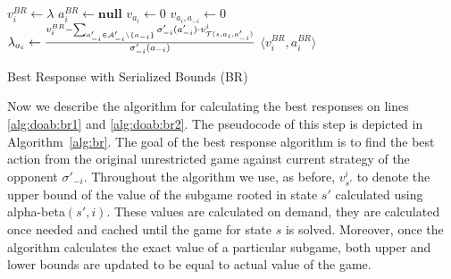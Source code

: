 \begin{algorithm2e}[t]
\small
{}
$v^{BR}_i \leftarrow \lambda$ \;
$a_i^{BR} \leftarrow \textbf{null}$ \;
 {%
	$v_{a_i} \leftarrow 0$\;
	 {\label{alg:br:opp}
    $v_{a_i,a_{-i}} \leftarrow 0$\;
		$\lambda_{a_i} \leftarrow \frac{v_i^{BR} - \sum_{a'_{-i} \in \mathcal{A}'_{-i} \setminus \lbrace a_{-i} \rbrace} \sigma'_{-i}(a'_{-i}) \cdot v^i_{\mathcal{T}(s,a_i,a'_{-i})}}{\sigma'_{-i}(a_{-i})}$\; \label{alg:br:bound}
	}
}
\Return $\langle v_i^{BR}, a_i^{BR} \rangle$
\caption{Best Response with Serialized Bounds (BR)}\label{alg:br}
\end{algorithm2e}

Now we describe the algorithm for calculating the best responses on lines \ref{alg:doab:br1} and \ref{alg:doab:br2}.
The pseudocode of this step is depicted in Algorithm~\ref{alg:br}.
The goal of the best response algorithm is to find the best action from the original unrestricted game against current strategy of the opponent $\sigma'_{-i}$.
Throughout the algorithm we use, as before, $v^i_{s'}$ to denote the upper bound of the value of the subgame rooted in state $s'$ calculated using alpha-beta$(s',i)$.
These values are calculated on demand, \ie they are calculated once needed and cached until the game for state $s$ is solved.
Moreover, once the algorithm calculates the exact value of a particular subgame, both upper and lower bounds are updated to be equal to actual value of the game.


